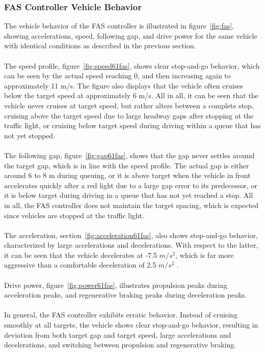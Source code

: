 \subsubsection{FAS Controller Vehicle Behavior}
The vehicle behavior of the FAS controller is illustrated in figure~\ref{fig:fas}, showing accelerations, speed, following gap, and drive power for the same vehicle with identical conditions as described in the previous section.
\\\\
The speed profile, figure~\ref{fig:speed61fas}, shows clear stop-and-go behavior, which can be seen by the actual speed reaching 0, and then increasing again to approximately 11 m/s. The figure also displays that the vehicle often cruises below the target speed at approximately 6 m/s. All in all, it can be seen that the vehicle never cruises at target speed, but rather alters between a complete stop, cruising above the target speed due to large headway gaps after stopping at the traffic light, or cruising below target speed during driving within a queue that has not yet stopped. 
\\\\
The following gap, figure~\ref{fig:gap61fas}, shows that the gap never settles around the target gap, which is in line with the speed profile. The actual gap is either around 6 to 8 m during queuing, or it is above target when the vehicle in front accelerates quickly after a red light due to a large gap error to its predecessor, or it is below target during driving in a queue that has not yet reached a stop. All in all, the FAS controller does not maintain the target spacing, which is expected since vehicles are stopped at the traffic light.
\\\\
The acceleration, section~\ref{fig:acceleration61fas}, also shows stop-and-go behavior, characterized by large accelerations and decelerations. With respect to the latter, it can be seen that the vehicle decelerates at -7.5 \(m/s^2\), which is far more aggressive than a comfortable deceleration of 2.5 \(m/s^2\) \parencite{carlowitz2026balancing}. 
\\\\
Drive power, figure~\ref{fig:power61fas}, illustrates propulsion peaks during acceleration peaks, and regenerative braking peaks during deceleration peaks.  
\\\\
In general, the FAS controller exhibits erratic behavior. Instead of cruising smoothly at all targets, the vehicle shows clear stop-and-go behavior, resulting in deviation from both target gap and target speed, large accelerations and decelerations, and switching between propulsion and regenerative braking. 




